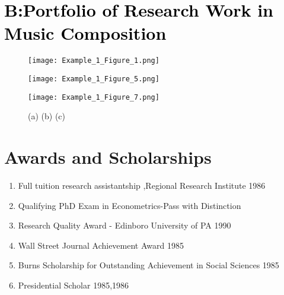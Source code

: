 \documentclass{TMLSStyleGuideResumeVitae}
\begin{document}
\section{\textcolor{black}{B:Portfolio of Research Work in Music Composition}}

\begin{figure}[h]
\centering
\begin{minipage}[b]{0.3\linewidth}
\texttt{[image: Example\_1\_Figure\_1.png]}
\end{minipage}\hfill
\begin{minipage}[b]{0.3\linewidth}
\texttt{[image: Example\_1\_Figure\_5.png]}
\end{minipage}\hfill	
\begin{minipage}[b]{0.3\linewidth}
\texttt{[image: Example\_1\_Figure\_7.png]}
\end{minipage}\hfill
\caption{(a) (b) (c) }
\label{fig:Figure1}
\end{figure} 

\newpage
\section{Awards and Scholarships}
\begin{enumerate} \itemsep -2pt
\item Full tuition research assistantship ,Regional Research Institute 1986  \\
\item Qualifying PhD Exam in Econometrics-Pass with Distinction\\
\item Research Quality Award - Edinboro University of PA 1990\\
\item Wall Street Journal Achievement Award 1985\\
\item Burns Scholarship for Outstanding Achievement in Social Sciences 1985\\
\item Presidential Scholar 1985,1986\\
\end{enumerate}
\end{document}
